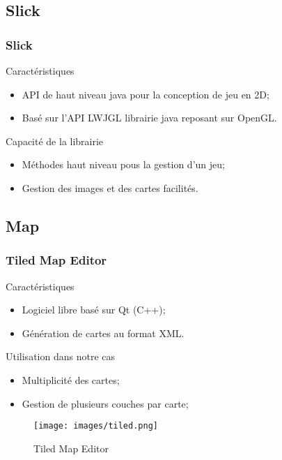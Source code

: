 \begin{frame}[c]
\end{frame}

\subsection{Slick}
\begin{frame}[c]
  \frametitle{Slick}
  \begin{block}{Caractéristiques}
    \begin{itemize}
    \item API de haut niveau java pour la conception de jeu en 2D;
    \item Basé sur l'API LWJGL librairie java reposant sur OpenGL.
    \end{itemize}
  \end{block}
  \begin{block}{Capacité de la librairie}
    \begin{itemize}
    \item Méthodes haut niveau pous la gestion d'un jeu;
    \item Gestion des images et des cartes facilités.
    \end{itemize}
  \end{block}
\end{frame}

\subsection{Map}
\begin{frame}[c]
  \frametitle{Tiled Map Editor}
  \begin{block}{Caractéristiques}
    \begin{itemize}
    \item Logiciel libre basé sur Qt (C++);
    \item Génération de cartes au format XML.
    \end{itemize}
  \end{block}
  \begin{block}{Utilisation dans notre cas}
    \begin{itemize}
    \item Multiplicité des cartes;
    \item Gestion de plusieurs couches par carte;
    \end{itemize}
  \end{block}
\end{frame}


\begin{frame}[c]
  \begin{figure}[htbp]
    \centering
    \texttt{[image: images/tiled.png]}
    \caption{Tiled Map Editor}
  \end{figure}
\end{frame}
